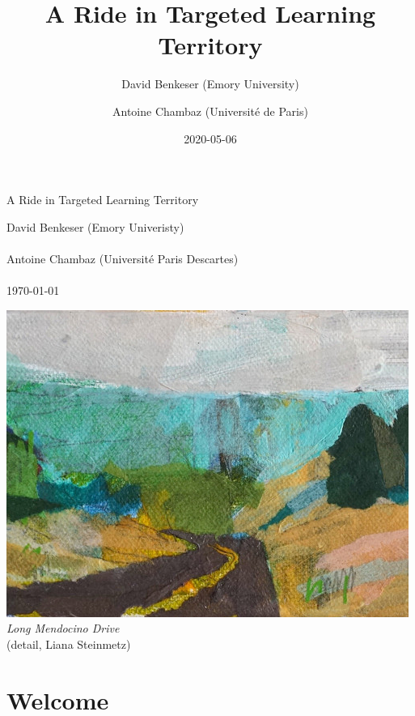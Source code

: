 \documentclass[11pt,openright,twoside]{book}
\title{A Ride in Targeted Learning Territory}
\author{David Benkeser (Emory University) \and Antoine Chambaz (Université de Paris)}
\date{2020-05-06}
\theoremstyle{definition}
\theoremstyle{definition}
\theoremstyle{definition}
\theoremstyle{remark}
\begin{document}
\maketitle

\begin{titlepage}
  \centering
  \vspace*{3cm}
  \begin{Huge}
    {\color{WildStrawberry}{\hrule}}
    \vspace{1cm}
    A Ride in Targeted Learning Territory
    \vspace{1cm}
    {\color{WildStrawberry}{\hrule}}
  \end{Huge}
  \vspace*{1cm}  
  \begin{large}
    David Benkeser (Emory Univeristy)\\~\\
    Antoine Chambaz (Universit\'e Paris Descartes)\\~\\
    \today\par
  \end{large}
  \vspace*{1cm}
  \includegraphics{cover.jpg}\\
  \textit{Long Mendocino Drive}\\
  (detail, Liana Steinmetz)
\end{titlepage}




{
\setcounter{tocdepth}{1}
\tableofcontents
}
\hypertarget{welcome}{%
\chapter*{Welcome}\label{welcome}}
\end{document}
